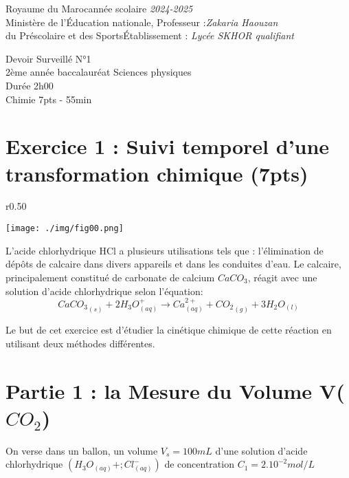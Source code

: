 \documentclass[12pt]{article}
\newcommand\headerMe[2]{\noindent{}#1\hfill#2}
\begin{document}
\headerMe{Royaume du Maroc}{année scolaire \emph{2024-2025}}\\
\headerMe{Ministère de l'Éducation nationale, }{  Professeur :\emph{Zakaria Haouzan}}\\
\headerMe{du Préscolaire et des Sports}{Établissement : \emph{Lycée SKHOR qualifiant}}\\
\vspace{-1cm}
\begin{center}
Devoir Surveillé  N°1 \\
    2ème année baccalauréat Sciences physiques \\
Durée 2h00
\\
    \vspace{.2cm}
\hrulefill
\Large{Chimie 7pts - 55min}
\hrulefill\\

\end{center}
\vspace{-1.1cm}
 \section*{Exercice 1 : Suivi temporel d’une transformation chimique \dotfill(7pts) }
 \begin{wrapfigure}[11]{r}{0.50\textwidth}

\begin{center}
	\vspace{-1,2cm}
  \texttt{[image: ./img/fig00.png]}
\end{center}
\end{wrapfigure}

L’acide chlorhydrique HCl a plusieurs utilisations tels que : l’élimination de 
dépôts de calcaire dans divers appareils et dans les conduites d’eau. Le calcaire, 
principalement constitué de carbonate de calcium $CaCO_3$, réagit avec une 
solution d’acide chlorhydrique selon l’équation:
$${CaCO_3}_{(s)} + 2H_3O^+_{(aq)} \rightarrow Ca^{2+}_{(aq)} + {CO_2}_{(g)} + 3H_2O_{(l)}$$

Le but de cet exercice est d’étudier la cinétique chimique de cette
réaction en utilisant deux méthodes différentes.
\vspace{-0.7cm}
 \section*{Partie 1 : la Mesure du Volume V($CO_2$)}
\hrulefill
On verse dans un ballon, un volume $V_s = 100mL$ d’une solution d’acide
chlorhydrique $(H_3O_{(aq)}+; Cl^-_{(aq)})$ de concentration $C_1 = 2.10^{-2} mol/L$
\end{document}
